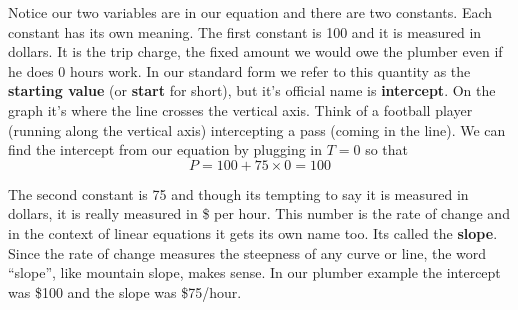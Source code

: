 Notice our two variables are in our equation and there are two constants. Each constant has its own meaning.  The first constant is 100 and it is measured in dollars.  It is the trip charge, the fixed amount we would owe the plumber even if he does 0 hours work.  In our standard form we refer to this quantity as the \textbf{starting value} (or \textbf{start} for short), but it's official name is \textbf{intercept}.  On the graph it's where the line crosses the vertical axis.  Think of a football player (running along the vertical axis) intercepting a pass (coming in the line).  We can find the intercept from our equation by plugging in $T = 0$ so that $$P = 100 + 75 \times 0 = 100$$

The second constant is 75 and though its tempting to say it is measured in dollars, it is really measured in \$ per hour.  This number is the rate of change and in the context of linear equations it gets its own name too.  Its called the \textbf{slope}.  Since the rate of change measures the steepness of any curve or line, the word ``slope'', like mountain slope, makes sense.  In our plumber example the intercept was \$100 and the slope was \$75/hour.  

